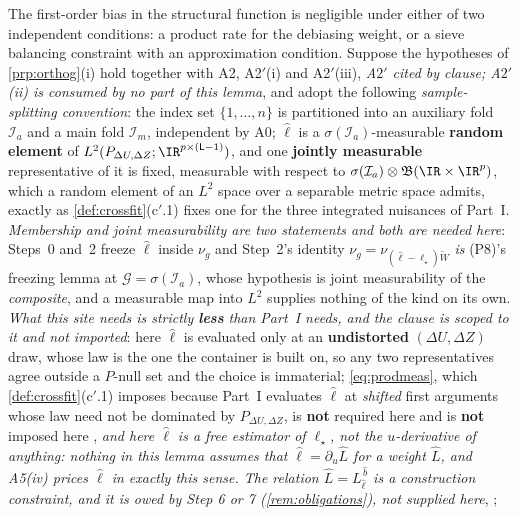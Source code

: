 \begin{lemma}\label{lem:balance}
The first-order bias in the structural function is negligible under either of two independent
conditions: a product rate for the debiasing weight, or a sieve balancing constraint with an
approximation condition.
Suppose the hypotheses of \cref{prp:orthog}(i) hold together with A2, A2$'$(i) and A2$'$(iii), 
\emph{A$2'$ cited by clause; A$2'$(ii) is consumed by no part of this lemma}, and adopt the following
\emph{sample-splitting convention}: the index set $\{1,\dots,n\}$ is partitioned into an auxiliary fold
$\mathcal I_a$ and a main fold $\mathcal I_m$, independent by A0; $\hat\ell$ is a
$\sigma(\mathcal I_a)$-measurable \textbf{random element} of
$L^{2}(P_{\Delta U,\Delta Z};\IR^{p\times(\mathsf L-1)})$, and one
\textbf{jointly measurable} representative of it is fixed, measurable with respect to
$\sigma(\mathcal I_a)\otimes\mathfrak B(\IR\times\IR^{p})$, which a random element of an $L^{2}$ space
over a separable metric space admits, exactly as \cref{def:crossfit}\textup{(c$'$.1)} fixes one for the
three integrated nuisances of Part~I. \emph{Membership and joint measurability are two statements and
both are needed here}: Steps~0
and~2 freeze $\hat\ell$ inside $\nu_g$ and Step~2's identity
$\nu_g=\nu_{(\hat\ell-\ell_\star)\widetilde W}$ \emph{is} \textup{(P8)}'s freezing lemma at
$\mathcal G=\sigma(\mathcal I_a)$, whose hypothesis is joint measurability of the \emph{composite}, and a
measurable map into $L^{2}$ supplies nothing of the kind on its own. \emph{What this site needs is
strictly \textbf{less} than Part~I needs, and the clause is scoped to it and not imported}: here
$\hat\ell$ is evaluated only at an \textbf{undistorted} $(\Delta U,\Delta Z)$ draw, whose law is the one
the container is built on, so any two representatives agree outside a $P$-null set and the choice is
immaterial; \eqref{eq:prodmeas}, which \cref{def:crossfit}\textup{(c$'$.1)} imposes because Part~I
evaluates $\hat\ell$ at \emph{shifted} first arguments whose law need not be dominated by
$P_{\Delta U,\Delta Z}$, is \textbf{not} required here and is \textbf{not} imposed here
, \emph{and here $\hat\ell$ is a free estimator of $\ell_\star$, not the $u$-derivative of anything:
nothing in this lemma assumes that $\hat\ell=\partial_u\hat L$ for a weight $\hat L$, and A5(iv) prices
$\hat\ell$ in exactly this sense. The relation $\hat L=L^{\,\hat b}_{\hat\ell}$ is a construction
constraint, and it is owed by Step 6 or 7 (\cref{rem:obligations}), not supplied here}, ;

\end{lemma}
